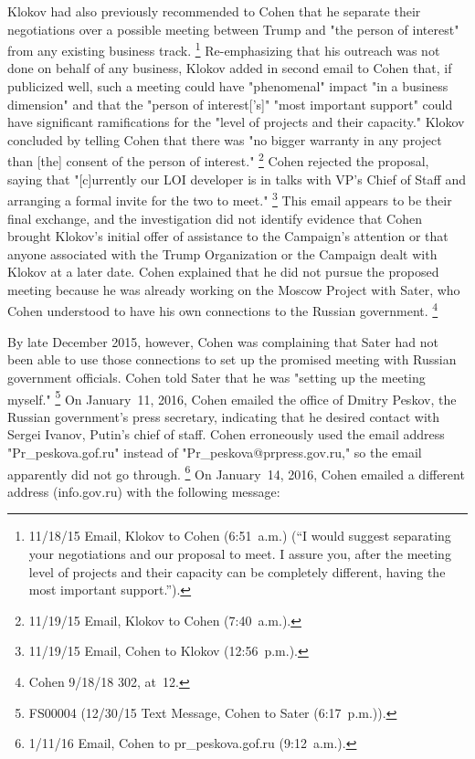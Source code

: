 Klokov had also previously recommended to Cohen that he separate their negotiations over a possible meeting between Trump and "the person of interest" from any existing business track.%
\footnote{11/18/15 Email, Klokov to Cohen (6:51~a.m.) (``I would suggest separating your negotiations and our proposal to meet.
I assure you, after the meeting level of projects and their capacity can be completely different, having the most important support.'').}
Re-emphasizing that his outreach was not done on behalf of any business, Klokov added in second email to Cohen that, if publicized well, such a meeting could have "phenomenal" impact "in a business dimension" and that the "person of interest['s]" "most important support" could have significant ramifications for the "level of projects and their capacity."
Klokov concluded by telling Cohen that there was "no bigger warranty in any project than [the] consent of the person of interest."%
\footnote{11/19/15 Email, Klokov to Cohen (7:40~a.m.).}
Cohen rejected the proposal, saying that "[c]urrently our LOI developer is in talks with VP's Chief of Staff and arranging a formal invite for the two to meet."%
\footnote{11/19/15 Email, Cohen to Klokov (12:56~p.m.).}
This email appears to be their final exchange, and the investigation did not identify evidence that Cohen brought Klokov's initial offer of assistance to the Campaign's attention or that anyone associated with the Trump Organization or the Campaign dealt with Klokov at a later date.
Cohen explained that he did not pursue the proposed meeting because he was already working on the Moscow Project with Sater, who Cohen understood to have his own connections to the Russian government.%
\footnote{Cohen 9/18/18 302, at~12.}

By late December 2015, however, Cohen was complaining that Sater had not been able to use those connections to set up the promised meeting with Russian government officials.
Cohen told Sater that he was "setting up the meeting myself."%
\footnote{FS00004 (12/30/15 Text Message, Cohen to Sater (6:17~p.m.)).}
On January~11, 2016, Cohen emailed the office of Dmitry Peskov, the Russian government's press secretary, indicating that he desired contact with Sergei Ivanov, Putin's chief of staff.
Cohen erroneously used the email address "Pr\_peskova\@prpress.gof.ru" instead of "Pr\_peskova@prpress.gov.ru," so the email apparently did not go through.%
\footnote{1/11/16 Email, Cohen to pr\_peskova\@prpress.gof.ru (9:12~a.m.).}
On January~14, 2016, Cohen emailed a different address (info\@prpress.gov.ru) with the following message:

